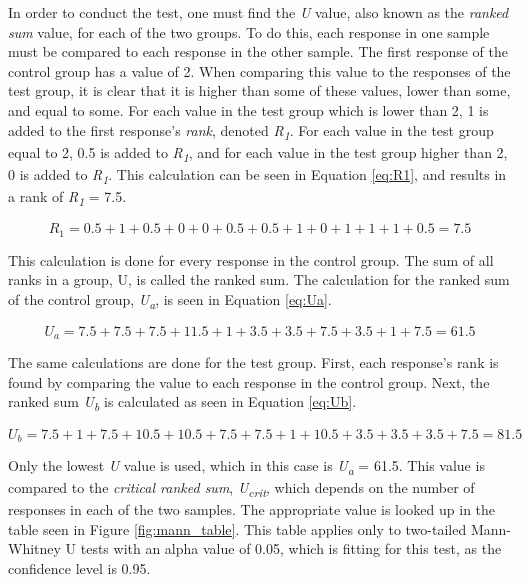 In order to conduct the test, one must find the \textit{U} value, also known as the \textit{ranked sum} value, for each of the two groups. To do this, each response in one sample must be compared to each response in the other sample. The first response of the control group has a value of 2. When comparing this value to the responses of the test group, it is clear that it is higher than some of these values, lower than some, and equal to some. For each value in the test group which is lower than 2, 1 is added to the first response's \textit{rank}, denoted \textit{R\textsubscript{1}}. For each value in the test group equal to 2, 0.5 is added to \textit{R\textsubscript{1}}, and for each value in the test group higher than 2, 0 is added to \textit{R\textsubscript{1}}. This calculation can be seen in Equation \ref{eq:R1}, and results in a rank of \textit{R\textsubscript{1}} = 7.5.

\begin{equation}
\label{eq:R1}
R_1 = 0.5 + 1 + 0.5 + 0 + 0 + 0.5 + 0.5 + 1 + 0 + 1 + 1 + 1 + 0.5 = 7.5
\end{equation}

This calculation is done for every response in the control group. The sum of all ranks in a group, U, is called the ranked sum. The calculation for the ranked sum of the control group, \textit{U\textsubscript{a}}, is seen in Equation \ref{eq:Ua}.

\begin{equation}
\label{eq:Ua}
U_a = 7.5 + 7.5 + 7.5 + 11.5 + 1 + 3.5 + 3.5 + 7.5 + 3.5 + 1 + 7.5 = 61.5
\end{equation}

The same calculations are done for the test group. First, each response's rank is found by comparing the value to each response in the control group. Next, the ranked sum \textit{U\textsubscript{b}} is calculated as seen in Equation \ref{eq:Ub}.

\begin{equation}
\label{eq:Ub}
U_b = 7.5 + 1 + 7.5 + 10.5 + 10.5 + 7.5 + 7.5 + 1 + 10.5 + 3.5 + 3.5 + 3.5 + 7.5 = 81.5
\end{equation}

Only the lowest \textit{U} value is used, which in this case is \textit{U\textsubscript{a}} = 61.5. This value is compared to the \textit{critical ranked sum}, \textit{U\textsubscript{crit}}, which depends on the number of responses in each of the two samples. The appropriate value is looked up in the table seen in Figure \ref{fig:mann_table}. This table applies only to two-tailed Mann-Whitney U tests with an alpha value of 0.05, which is fitting for this test, as the confidence level is 0.95.

